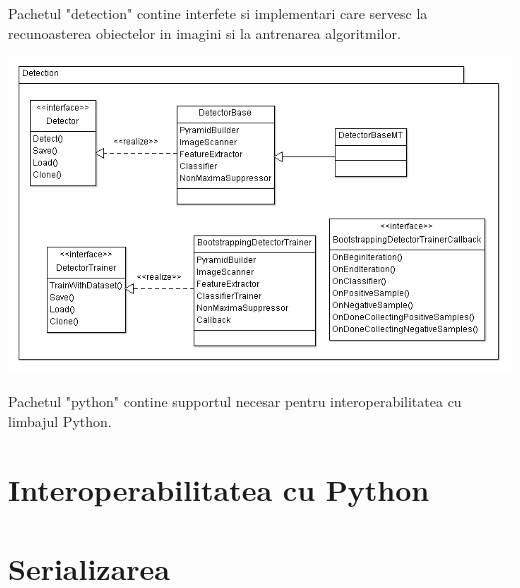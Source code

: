 Pachetul "detection" contine interfete si implementari care servesc la recunoasterea obiectelor in imagini si la antrenarea algoritmilor.
\begin{center}
	\includegraphics[width=1.00\textwidth]{uml/detection_diagram.png}
\end{center}

Pachetul "python" contine supportul necesar pentru interoperabilitatea cu limbajul Python.



\pagebreak

\section{Interoperabilitatea cu Python}
\pagebreak

\section{Serializarea}
\pagebreak
